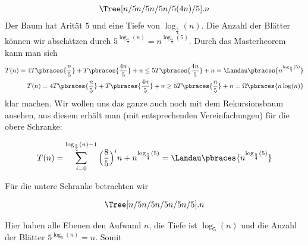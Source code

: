 \begin{solution}
	\begin{align*}
	\Tree [n/5 n/5 n/5 n/5 (4n)/5 ].n
	\end{align*}
	Der Baum hat Arität $5$ und eine Tiefe von $\log_{\frac{5}{4}}(n)$. Die Anzahl der Blätter können wir abschätzen durch $5^{\log_\frac{5}{4}(n)} = n^{\log_{\frac{5}{4}}(5)}$. Durch das Masterheorem kann man sich
	\begin{align*}
	T(n) = 4 T\pbraces{\frac{n}{5}} + T\pbraces{\frac{4n}{5}} + n \leq 5 T\pbraces{\frac{4n}{5}} + n = \Landau\pbraces{n^{\log_\frac{5}{4}(5)}} \\
	T(n) = 4 T\pbraces{\frac{n}{5}} + T\pbraces{\frac{4n}{5}} + n \geq 5 T\pbraces{\frac{n}{5}} + n = \Omega\pbraces{n\log(n)}
	\end{align*}
	klar machen. Wir wollen uns das ganze auch noch mit dem Rekursionsbaum ansehen, aus diesem erhält man (mit entsprechenden Vereinfachungen) für die obere Schranke:

  \begin{align*}
    T(n) = \sum_{i=0}^{\log_{\frac{5}{4}}(n)-1} \Big(\frac{8}{5}\Big)^i n + n^{\log_{\frac{5}{4}}(5)} = \Landau\pbraces{n^{\log_\frac{5}{4}(5)}}
  \end{align*}

  Für die untere Schranke betrachten wir

  \begin{align*}
	\Tree [n/5 n/5 n/5 n/5 n/5 ].n
	\end{align*}

  Hier haben alle Ebenen den Aufwand $n$, die Tiefe ist $\log_5(n)$ und die Anzahl der Blätter $5^{\log_5(n)} = n$. Somit


\end{solution}
